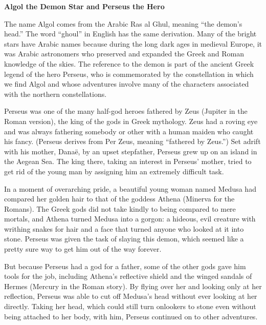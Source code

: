 \documentclass{article}
\numberwithin{equation}{section}
\numberwithin{figure}{section}
\begin{document}
\clearpage
\begin{mdframed}[backgroundcolor=black!5]
\textbf{Algol the Demon Star and Perseus the Hero}
\vspace{1em}

The name Algol comes from the Arabic Ras al Ghul, meaning ``the demon's head.'' The word ``ghoul'' in English has the same derivation. Many of the bright stars have Arabic names because during the long dark ages in medieval Europe, it was Arabic astronomers who preserved and expanded the Greek and Roman knowledge of the skies. The reference to the demon is part of the ancient Greek legend of the hero Perseus, who is commemorated by the constellation in which we find Algol and whose adventures involve many of the characters associated with the northern constellations.
\vspace{1em}

Perseus was one of the many half-god heroes fathered by Zeus (Jupiter in the Roman version), the king of the gods in Greek mythology. Zeus had a roving eye and was always fathering somebody or other with a human maiden who caught his fancy. (Perseus derives from Per Zeus, meaning ``fathered by Zeus.'') Set adrift with his mother, Dana\"{e}, by an upset stepfather, Perseus grew up on an island in the Aegean Sea. The king there, taking an interest in Perseus' mother, tried to get rid of the young man by assigning him an extremely difficult task.
\vspace{1em}

In a moment of overarching pride, a beautiful young woman named Medusa had compared her golden hair to that of the goddess Athena (Minerva for the Romans). The Greek gods did not take kindly to being compared to mere mortals, and Athena turned Medusa into a gorgon: a hideous, evil creature with writhing snakes for hair and a face that turned anyone who looked at it into stone. Perseus was given the task of slaying this demon, which seemed like a pretty sure way to get him out of the way forever.
\vspace{1em}

But because Perseus had a god for a father, some of the other gods gave him tools for the job, including Athena's reflective shield and the winged sandals of Hermes (Mercury in the Roman story). By flying over her and looking only at her reflection, Perseus was able to cut off Medusa's head without ever looking at her directly. Taking her head, which could still turn onlookers to stone even without being attached to her body, with him, Perseus continued on to other adventures.
\vspace{1em}


\end{mdframed}
\end{document}
